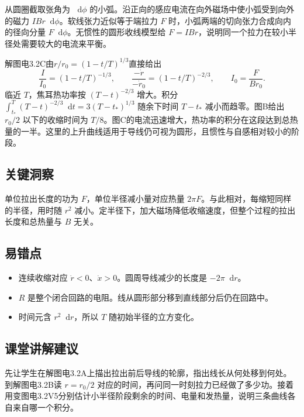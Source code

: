 \documentclass[UTF8,fontset=fandol,a4paper,11pt]{ctexart}
\newcommand{\dd}{\mathop{}\!\mathrm{d}}
\begin{document}
从圆圈截取张角为 $\dd\phi$ 的小弧。沿正向的感应电流在向外磁场中使小弧受到向外的磁力 $IBr\dd\phi$。软线张力近似等于端拉力 $F$ 时，小弧两端的切向张力合成向内的径向分量 $F\dd\phi$。无惯性的圆形收线模型给 $F=IBr$，说明同一个拉力在较小半径处需要较大的电流来平衡。

解图电3.2C由$r/r_0=(1-t/T)^{1/3}$直接给出
\[
\frac{I}{I_0}=(1-t/T)^{-1/3},\qquad
\frac{-\dot r}{-\dot r_0}=(1-t/T)^{-2/3},\qquad I_0=\frac{F}{Br_0}.
\]
临近 $T$，焦耳热功率按 $(T-t)^{-2/3}$ 增大。积分 $\int_{t_*}^T(T-t)^{-2/3}\dd t=3(T-t_*)^{1/3}$ 随余下时间 $T-t_*$ 减小而趋零。图B给出 $r_0/2$ 以下的收缩时间为 $T/8$。图C的电流迅速增大，热功率的积分在这段达到总热量的一半。这里的上升曲线适用于导线仍可视为圆形，且惯性与自感相对较小的阶段。




\subsection*{关键洞察}

单位拉出长度的功为 $F$，单位半径减小量对应热量 $2\pi F$。与此相对，每缩短同样的半径，用时随 $r^2$ 减小。定半径下，加大磁场降低收缩速度，但整个过程的拉出长度和总热量与 $B$ 无关。



\subsection*{易错点}

\begin{itemize}
\item 连续收缩对应 $\dot r<0$、$\dot x>0$。圆周导线减少的长度是 $-2\pi\dd r$。
\item $R$ 是整个闭合回路的电阻。线从圆形部分移到直线部分后仍在回路中。
\item 时间元含 $r^2\dd r$，所以 $T$ 随初始半径的立方变化。
\end{itemize}



\subsection*{课堂讲解建议}

先让学生在解图电3.2A上描出拉出前后导线的轮廓，指出线长从何处移到何处。到解图电3.2B读 $r=r_0/2$ 对应的时间，再问同一时刻拉力已经做了多少功。接着用变图电3.2V5分别估计小半径阶段剩余的时间、电量和发热量，说明三条曲线各自来自哪一个积分。
\end{document}
